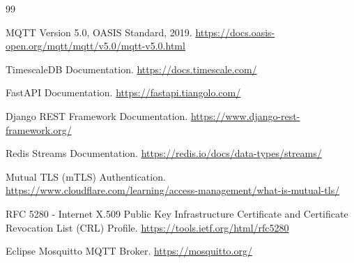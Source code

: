 \newpage
{}
{}

\begin{thebibliography}{99}


MQTT Version 5.0, OASIS Standard, 2019.
\url{https://docs.oasis-open.org/mqtt/mqtt/v5.0/mqtt-v5.0.html}

TimescaleDB Documentation.
\url{https://docs.timescale.com/}

FastAPI Documentation.
\url{https://fastapi.tiangolo.com/}

Django REST Framework Documentation.
\url{https://www.django-rest-framework.org/}

Redis Streams Documentation.
\url{https://redis.io/docs/data-types/streams/}

Mutual TLS (mTLS) Authentication.
\url{https://www.cloudflare.com/learning/access-management/what-is-mutual-tls/}

RFC 5280 - Internet X.509 Public Key Infrastructure Certificate and Certificate Revocation List (CRL) Profile.
\url{https://tools.ietf.org/html/rfc5280}

Eclipse Mosquitto MQTT Broker.
\url{https://mosquitto.org/}

\end{thebibliography}
